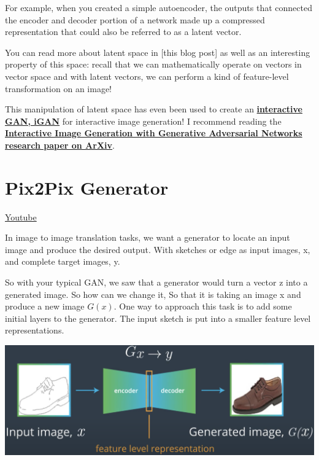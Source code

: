 For example, when you created a simple autoencoder, the outputs that connected the encoder and decoder portion of a network made up a compressed representation that could also be referred to as a latent vector. \newline

You can read more about latent space in [this blog post] as well as an interesting property of this space: recall that we can mathematically operate on vectors in vector space and with latent vectors, we can perform a kind of feature-level transformation on an image! \newline

This manipulation of latent space has even been used to create an \href{https://github.com/junyanz/iGAN/blob/master/README.md}{\textbf{interactive GAN, iGAN}} for interactive image generation! I recommend reading the \href{https://arxiv.org/abs/1609.03552}{\textbf{Interactive Image Generation with Generative Adversarial Networks research paper on ArXiv}}.

\section{Pix2Pix Generator}
\href{https://www.youtube.com/watch?v=94Kml3ekrUI}{Youtube}

In image to image translation tasks, we want a generator to locate an input image and produce the desired output. With sketches or edge as input images, x, and complete target images, y. \newline

So with your typical GAN, we saw that a generator would turn a vector z into a generated image. So how can we change it, So that it is taking an image x and produce a new image \(G(x)\). One way to approach this task is to add some initial layers to the generator. The input sketch is put into a smaller feature level representations.

\includegraphics[width=1\linewidth]{img//genAdvNet//image2image/pix2pixGen.png}

